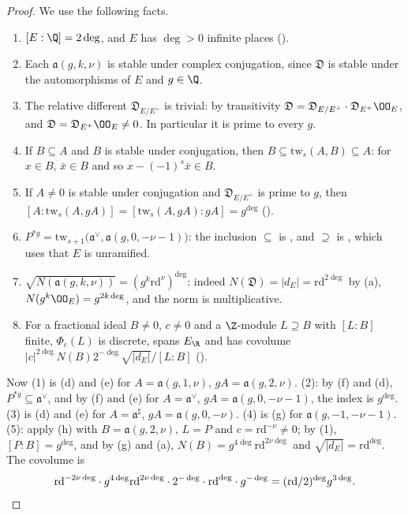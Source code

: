 \begin{proof}
We use the following facts.
\begin{enumerate}[label=(\alph*)]
\item $[E:\Q]=2\deg$, and $E$ has $\deg>0$ infinite places ().
\item Each $\mathfrak a(g,k,\nu)$ is stable under complex conjugation, since $\mathfrak D$ is stable under the automorphisms of $E$
and $g\in\Q$.
\item The relative different $\mathfrak D_{E/E^+}$ is trivial: by transitivity $\mathfrak D=\mathfrak D_{E/E^+}\cdot\mathfrak
D_{E^+}\OO_E$, and $\mathfrak D=\mathfrak D_{E^+}\OO_E\ne0$. In particular it is prime to every $g$.
\item If $B\subseteq A$ and $B$ is stable under conjugation, then $B\subseteq\mathrm{tw}_s(A,B)\subseteq A$: for $x\in B$,
$\bar x\in B$ and so $x-(-1)^s\bar x\in B$.
\item If $A\ne0$ is stable under conjugation and $\mathfrak D_{E/E^+}$ is prime to $g$, then
$[A:\mathrm{tw}_s(A,gA)]=[\mathrm{tw}_s(A,gA):gA]=g^{\deg}$ ().
\item $P^{*g}=\mathrm{tw}_{s+1}\bigl(\mathfrak a^\vee,\mathfrak a(g,0,-\nu-1)\bigr)$: the inclusion $\subseteq$ is
, and $\supseteq$ is
, which uses that $E$ is unramified.
\item $\sqrt{N(\mathfrak a(g,k,\nu))}=(g^k\mathrm{rd}^\nu)^{\deg}$: indeed $N(\mathfrak D)=|d_E|=\mathrm{rd}^{2\deg}$ by (a),
$N(g^k\OO_E)=g^{2k\deg}$, and the norm is multiplicative.
\item For a fractional ideal $B\ne0$, $c\ne0$ and a $\Z$-module $L\supseteq B$ with $[L:B]$ finite, $\Phi_c(L)$ is discrete, spans
$E_\R$ and has covolume $|c|^{2\deg}N(B)2^{-\deg}\sqrt{|d_E|}/[L:B]$ ().
\end{enumerate}
Now (1) is (d) and (e) for $A=\mathfrak a(g,1,\nu)$, $gA=\mathfrak a(g,2,\nu)$. (2): by (f) and (d), $P^{*g}\subseteq\mathfrak a^\vee$,
and by (f) and (e) for $A=\mathfrak a^\vee$, $gA=\mathfrak a(g,0,-\nu-1)$, the index is $g^{\deg}$. (3) is (d) and (e) for
$A=\mathfrak a^\sharp$, $gA=\mathfrak a(g,0,-\nu)$. (4) is (g) for $\mathfrak a(g,-1,-\nu-1)$. (5): apply (h) with
$B=\mathfrak a(g,2,\nu)$, $L=P$ and $c=\mathrm{rd}^{-\nu}\ne0$; by (1), $[P:B]=g^{\deg}$, and by (g) and (a),
$N(B)=g^{4\deg}\mathrm{rd}^{2\nu\deg}$ and $\sqrt{|d_E|}=\mathrm{rd}^{\deg}$. The covolume is
\[
\mathrm{rd}^{-2\nu\deg}\cdot g^{4\deg}\mathrm{rd}^{2\nu\deg}\cdot2^{-\deg}\cdot\mathrm{rd}^{\deg}\cdot g^{-\deg}=(\mathrm{rd}/2)^{\deg}g^{3\deg}.
\qedhere
\]
\end{proof}

